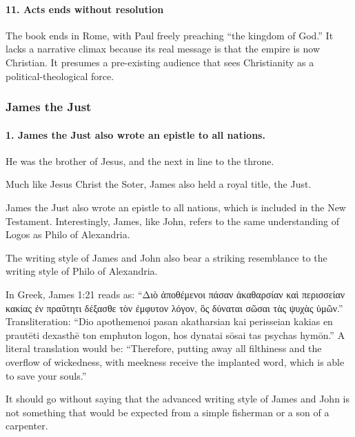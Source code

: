 \paragraph{11.
Acts ends without resolution}\label{par:acts-ends-without-resolution}

The book ends in Rome, with Paul freely preaching ``the kingdom of God.'' It lacks a narrative climax because its real message is that the empire is now Christian.
It presumes a pre-existing audience that sees Christianity as a political-theological force.

\subsubsection{James the Just}\label{par:james-the-just}

\paragraph{1.
James the Just also wrote an epistle to all nations.}\label{par:james-the-just-also-wrote-an-epistle-to-all-nations.}

He was the brother of Jesus, and the next in line to the throne.

Much like Jesus Christ the Soter, James also held a royal title, the Just.

James the Just also wrote an epistle to all nations, which is included in the New Testament.
Interestingly, James, like John, refers to the same understanding of Logos as Philo of Alexandria.

The writing style of James and John also bear a striking resemblance to the writing style of Philo of Alexandria.

In Greek, James 1:21 reads as: ``Διὸ ἀποθέμενοι πάσαν ἀκαθαρσίαν καὶ περισσείαν κακίας ἐν πραΰτητι δέξασθε τὸν ἐμφυτον λόγον, ὃς δύναται σῶσαι τὰς ψυχὰς ὑμῶν.'' Transliteration: ``Dio apothemenoi pasan akatharsian kai perisseian kakias en prautēti dexasthē ton emphuton logon, hos dynatai sōsai tas psychas hymōn.'' A literal translation would be: ``Therefore, putting away all filthiness and the overflow of wickedness, with meekness receive the implanted word, which is able to save your souls.''

It should go without saying that the advanced writing style of James and John is not something that would be expected from a simple fisherman or a son of a carpenter.
